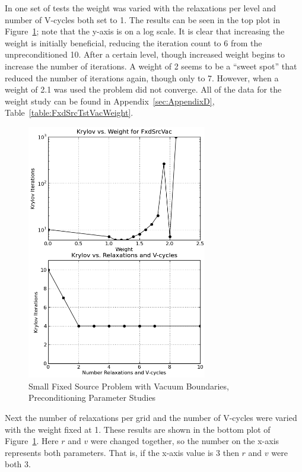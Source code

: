 In one set of tests the weight was varied with the relaxations per level and number of V-cycles both set to 1. The results can be seen in the top plot in Figure~\ref{fig:FxdSrcVac}; note that the y-axis is on a log scale. It is clear that increasing the weight is initially beneficial, reducing the iteration count to 6 from the unpreconditioned 10. After a certain level, though increased weight begins to increase the number of iterations. A weight of 2 seems to be a ``sweet spot'' that reduced the number of iterations again, though only to 7. However, when a weight of 2.1 was used the problem did not converge. All of the data for the weight study can be found in Appendix~\ref{sec:AppendixD}, Table~\ref{table:FxdSrcTstVacWeight}.
%
\begin{figure}[!ht]
    \begin{center}
      \includegraphics [width=0.7\textwidth, height=0.8\textheight] {FxdSrcVac}
   \end{center}
   \caption{Small Fixed Source Problem with Vacuum Boundaries, Preconditioning Parameter Studies}
   \label{fig:FxdSrcVac}
\end{figure}

Next the number of relaxations per grid and the number of V-cycles were varied with the weight fixed at 1. These results are shown in the bottom plot of Figure~\ref{fig:FxdSrcVac}. Here $r$ and $v$ were changed together, so the number on the x-axis represents both parameters. That is, if the x-axis value is 3 then $r$ and $v$ were both 3. 

